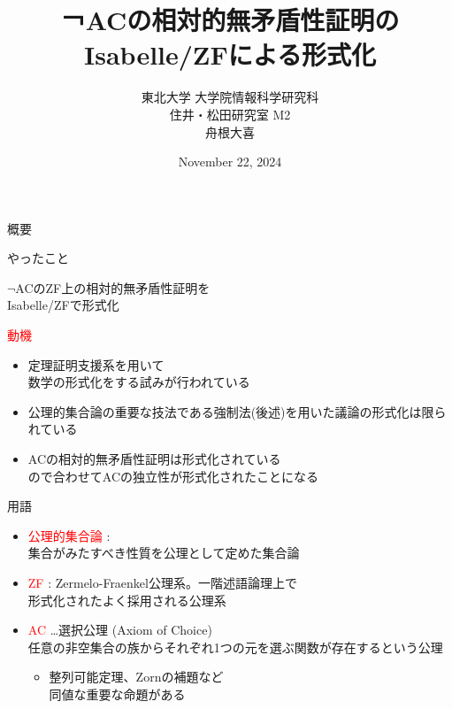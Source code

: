 \documentclass[17pt]{beamer}
\title{￢ACの相対的無矛盾性証明のIsabelle/ZFによる形式化}
\author{東北大学 大学院情報科学研究科\\ 住井・松田研究室 M2\\ 舟根大喜}
\date{November 22, 2024}
\begin{document}
\maketitle

\begin{frame}{概要}
    \vspace{-5pt}
    \begin{itembox}[l]{やったこと}
        \begin{center}
        \vspace{-3pt}
        $\neg$ACのZF上の相対的無矛盾性証明を\\
        Isabelle/ZFで形式化
        \vspace{-3pt}
        \end{center}
    \end{itembox}
    \vspace{-5pt}
    {\small
    \textcolor{red}{動機}
    \begin{itemize}[itemsep=1pt]
    \vspace{-5pt}
        \item 定理証明支援系を用いて\\
        数学の形式化をする試みが行われている
        \item 公理的集合論の重要な技法である強制法(後述)を用いた議論の形式化は限られている
        \item ACの相対的無矛盾性証明は形式化されている\\
        ので合わせてACの独立性が形式化されたことになる
    \end{itemize}}
\end{frame}

\begin{frame}{用語}\,
    \vspace{-20pt}
    {\small 
        \begin{itemize}[itemsep=8pt]
            \item \textcolor{red}{公理的集合論} : \\
            集合がみたすべき性質を公理として定めた集合論
            \item \textcolor{red}{ZF} : 
            Zermelo-Fraenkel公理系。一階述語論理上で\\
            形式化されたよく採用される公理系
            \item \textcolor{red}{AC} \ldots 選択公理 (Axiom of Choice)\\
            任意の非空集合の族からそれぞれ1つの元を選ぶ関数が存在するという公理
            \begin{itemize}
                \item 整列可能定理、Zornの補題など\\同値な重要な命題がある
            \end{itemize}

        \end{itemize}
    }
\end{frame}
\end{document}
